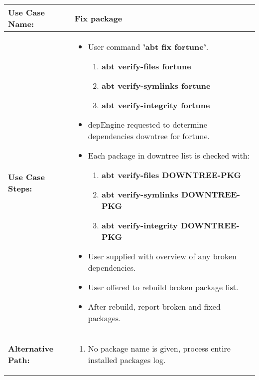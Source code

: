 \medskip

\begin{tabularx}{\linewidth}{|l|X|}
\hline
\textbf{Use Case Name:} & \textbf{Fix package} \\
\hline
\textbf{Use Case Steps:} & 
\begin{minipage}{\linewidth} 
  \vspace{0.05em}
  \begin{itemize}
    \item User command \textbf{'abt fix fortune'}.
    \begin{enumerate}
      \item \textbf{abt verify-files fortune}
      \item \textbf{abt verify-symlinks fortune}
      \item \textbf{abt verify-integrity fortune}
    \end{enumerate}
    \item depEngine requested to determine dependencies downtree for fortune.
    \item Each package in downtree list is checked with:
    \begin{enumerate}
      \item \textbf{abt verify-files DOWNTREE-PKG}
      \item \textbf{abt verify-symlinks DOWNTREE-PKG}
      \item \textbf{abt verify-integrity DOWNTREE-PKG}
    \end{enumerate}
    \item User supplied with overview of any broken dependencies.
    \item User offered to rebuild broken package list.
    \item After rebuild, report broken and fixed packages.
  \end{itemize}
  \vspace{0.05em}
\end{minipage}
\\
\hline 
\textbf{Alternative Path:} &
\begin{minipage}{\linewidth}
  \vspace{0.05em} 
  \begin{enumerate}
    \item No package name is given, process entire installed packages log.
  \end{enumerate}
  \vspace{0.05em} 
\end{minipage}
\\
\hline
\end{tabularx}

\newpage

